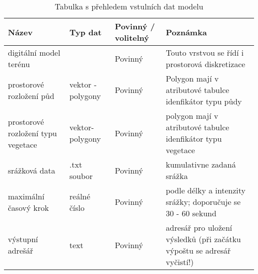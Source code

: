 
% 
\begin{sidewaystable}
\centering
\caption{Tabulka s přehledem vstulních dat modelu}
\label{tab:vstupy}
\small{
\begin{tabular}{lllp{7.5cm}}
\hline
Název                              & Typ dat                                               & Povinný / volitelný & Poznámka                                                                                                                                                      \\ \hline \hline
digitální model terénu             & \cellcolor[HTML]{96FFFB}{\color[HTML]{000000} raster} & Povinný           & Touto vrstvou se řídí i prostorová diskretizace                                                                                                               \\ \hline
prostorové rozložení půd           & \cellcolor[HTML]{FFC702}vektor - polygony             & Povinný           & Polygon mají v atributové tabulce idenfikátor typu půdy                                                                                                       \\ \hline
prostorové rozložení typu vegetace & \cellcolor[HTML]{FFC702}vektor- polygony              & Povinný           & polygon mají v atributové tabulce idenfikátor typu vegetace                                                                                                   \\ \hline
srážková data                      & .txt soubor                                           & Povinný           & kumulativne zadaná srážka                                                                                                                                     \\ \hline
maximální časový krok              & reálné číslo                                          & Povinný           & podle délky a intenzity srážky; doporučuje se 30 - 60 sekund                                                                                                  \\ \hline
výstupní adrešář                   & text                                                  & Povinný           & adresář pro uložení výsledků (při začátku výpoštu se adresář vyčistí!)                                                                                        \\ \hline

\end{tabular}}
\end{sidewaystable}
